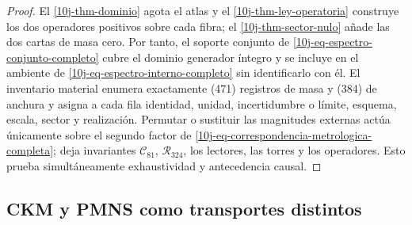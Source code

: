 \begin{proof}
El \cref{10j-thm-dominio} agota el atlas y el
\cref{10j-thm-ley-operatoria} construye los dos operadores positivos sobre
cada fibra; el \cref{10j-thm-sector-nulo} añade las dos cartas de masa cero.
Por tanto, el soporte conjunto de \eqref{10j-eq-espectro-conjunto-completo}
cubre el dominio generador íntegro y se incluye en el ambiente de
\eqref{10j-eq-espectro-interno-completo} sin identificarlo con él. El
inventario material enumera exactamente (471) registros de masa
y (384) de anchura y asigna a cada fila identidad, unidad, incertidumbre o
límite, esquema, escala, sector y realización. Permutar o sustituir las
magnitudes externas actúa únicamente sobre el segundo factor de
\eqref{10j-eq-correspondencia-metrologica-completa}; deja invariantes
\(\mathcal C_{81}\), \(\mathcal R_{324}\), los lectores, las torres y los
operadores. Esto prueba simultáneamente exhaustividad y antecedencia causal.
\end{proof}

\subsection{CKM y PMNS como transportes distintos}

